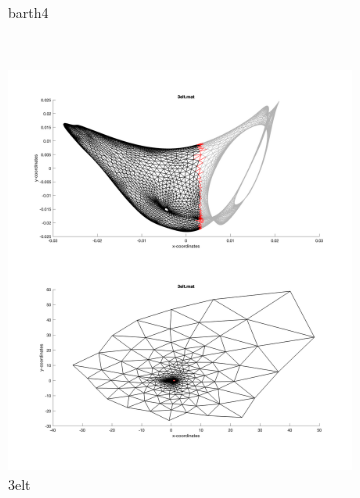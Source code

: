 \begin{figure}[H]
\begin{subfigure}{0.5\textwidth}
		\caption{barth4}
		\label{fig:coord_crack}
	\end{subfigure}\\
	\begin{subfigure}{0.5\textwidth}
		\includegraphics[width=\textwidth]{./media/3elt_eigen.png}
		\caption{3elt}
		\label{fig:metis_crack}
	\end{subfigure}%
    ~
	\begin{subfigure}{0.5\textwidth}

\end{subfigure}
\end{figure}

